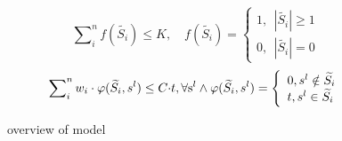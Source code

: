 \documentclass[conference,compsoc]{IEEEtran}
\begin{document}
\begin{equation}
\sum\nolimits_i^n {f(\widetilde {{S_i}}) \le } K,\quad f(\widetilde {{S_i}}) = \left\{ \begin{array}{l}
1,\ \ \left| {\widetilde {{S_i}}} \right| \ge 1\\
0,\ \ \left| {\widetilde {{S_i}}} \right| = 0
\end{array} \right.
\end{equation}
\begin{equation}
\sum\nolimits_i^n {{w_i} \cdot \varphi (\widetilde {{S_i}},{s^l}) \le C \cdot } t,{\rm{  }}\forall {{\rm{s}}^l} \wedge \varphi (\widetilde {{S_i}},{s^l}) = \left\{ \begin{array}{l}
0,{s^l} \notin \widetilde {{S_i}}\\
t,{s^l} \in \widetilde {{S_i}}
\end{array} \right.
\end{equation}
 
 

\begin{figure}[!!!!!!!!!!!!!!hhhhhhhhhht]
\centering
{}

 
\caption{overview of model}
\label{fig_1_model}
\end{figure}


 
\end{document}
